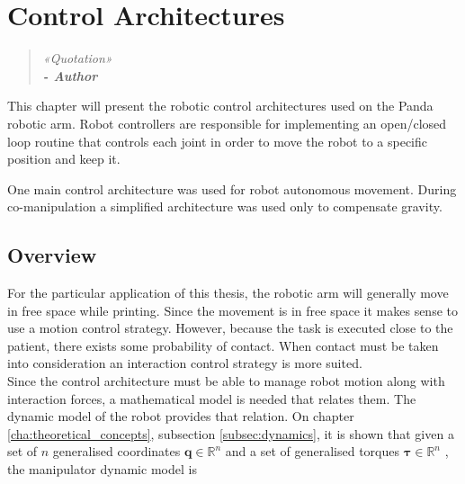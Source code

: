 \chapter{Control Architectures}
\label{cha:control_architectures}

\begin{quotation}
\begin{flushright}
\itshape
«Quotation»\\
\textbf{- Author}
\end{flushright}
\end{quotation}

This chapter will present the robotic control architectures used on the Panda robotic arm. Robot controllers are responsible for implementing an open/closed loop routine that controls each joint in order to move the robot to a specific position and keep it.

One main control architecture was used for robot autonomous movement. During co-manipulation a simplified architecture was used only to compensate gravity.


\section{Overview}
\label{sec:control_architectures_overview}

For the particular application of this thesis, the robotic arm will generally move in free space while printing. Since the movement is in free space it makes sense to use a motion control strategy. However, because the task is executed close to the patient, there exists some probability of contact. When contact must be taken into consideration an interaction control strategy is more suited.\\

Since the control architecture must be able to manage robot motion along with interaction forces, a mathematical model is needed that relates them. The dynamic model of the robot provides that relation. On chapter \ref{cha:theoretical_concepts}, subsection \ref{subsec:dynamics}, it is shown that given a set of $n$ generalised coordinates $\boldsymbol{q} \in \mathbb{R}^n$ and a set of generalised torques $\boldsymbol{\tau} \in \mathbb{R}^n$
, the manipulator
dynamic model is

